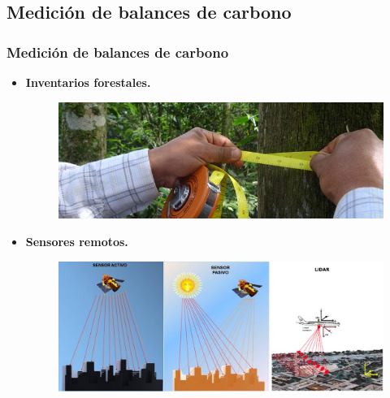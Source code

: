 \documentclass[xcolor=table]{beamer}
\begin{document}
		\subsection{Medici\'on de balances de carbono}
		\begin{frame}
			\frametitle{Medici\'on de balances de carbono}		
			\begin{itemize}
				\item \textbf{Inventarios forestales.} 
				\begin{figure}[h!]
				\centering
				\includegraphics[width=0.7\linewidth]{imagenes/inventario-forestal}
				\label{fig:inventario-forestal}
				\end{figure}

				\item \textbf{Sensores remotos.} 
				\begin{figure}[h!]
				\centering
				\includegraphics[width=0.7\linewidth]{imagenes/sensores}

				\label{fig:sensores}
				\end{figure}

			\end{itemize}
		\end{frame}
\end{document}
